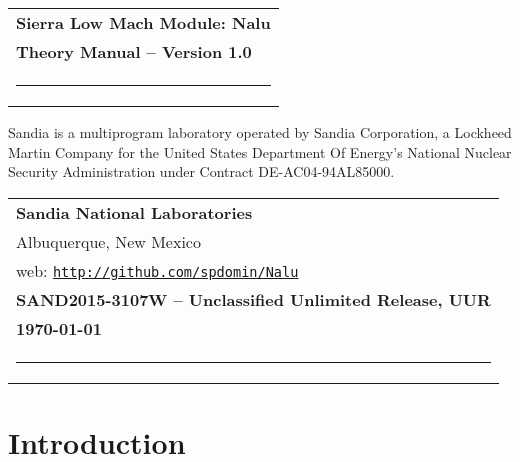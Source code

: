 \documentclass[12pt]{report}
\begin{document}

\thispagestyle{empty}

\phantom{.}
\vspace{1.0in}

\noindent
\begin{tabular}{l}
{\Large \bf Sierra Low Mach Module: Nalu} \\
{\Large \bf Theory Manual -- Version 1.0} \\[12pt]
\rule[5pt]{6.5in}{0.05in} \\
\end{tabular}

\vspace{1.5in}

Sandia is a multiprogram laboratory operated by Sandia Corporation, a Lockheed Martin
Company for the United States Department Of Energy's National Nuclear
Security Administration under Contract DE-AC04-94AL85000.

\vspace{3.0in}

\noindent
\begin{tabular}{l}
{\large \bf Sandia National Laboratories} \\
{Albuquerque, New Mexico} \\
{web: \texttt{\href{http://github.com/spdomin/Nalu}{http://github.com/spdomin/Nalu}}} \\
{\large \bf SAND2015-3107W -- Unclassified Unlimited Release, UUR} \\
{\bf \today} \\
\rule[7pt]{6.5in}{0.025in}
\end{tabular}

\clearpage
{}
\setcounter{page}{2}

\clearpage
\tableofcontents

\clearpage
\ifpdf
  \label{listoffigures}
\fi
{}
\listoffigures

\clearpage
\ifpdf
  \label{listoftables}
\fi
{}
\listoftables

\clearpage
{}
\setcounter{page}{1}

\section{Introduction}

\end{document}
